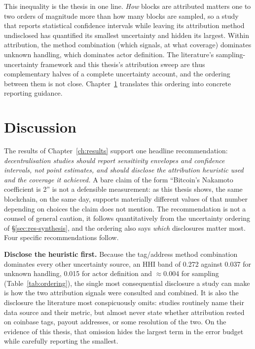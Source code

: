 \documentclass[logo,msc]{infthesis}           %
\begin{document}
This inequality is the thesis in one line. \emph{How} blocks are attributed
matters one to two orders of magnitude more than how many blocks are sampled,
so a study that reports statistical confidence intervals while leaving its
attribution method undisclosed has quantified its smallest uncertainty and
hidden its largest. Within attribution, the method combination (which signals,
at what coverage) dominates unknown handling, which dominates actor definition.
The literature's sampling-uncertainty framework \cite{milad2024statistical} and
this thesis's attribution sweep are thus complementary halves of a complete
uncertainty account, and the ordering between them is not close.
Chapter~\ref{ch:discussion} translates this ordering into concrete reporting
guidance.


\chapter{Discussion}
\label{ch:discussion}

The results of Chapter~\ref{ch:results} support one headline recommendation:
\emph{decentralisation studies should report sensitivity envelopes and
confidence intervals, not point estimates, and should disclose the attribution
heuristic used and the coverage it achieved.} A bare claim of the form
``Bitcoin's Nakamoto coefficient is 2'' is not a defensible measurement: as
this thesis shows, the same blockchain, on the same day, supports materially
different values of that number depending on choices the claim does not
mention. The recommendation is not a counsel of general caution, it follows
quantitatively from the uncertainty ordering of \S\ref{sec:res-synthesis}, and
the ordering also says \emph{which} disclosures matter most. Four specific
recommendations follow.

\textbf{Disclose the heuristic first.} Because the tag/address method
combination dominates every other uncertainty source, an HHI band of 0.272
against 0.037 for unknown handling, 0.015 for actor definition and
$\approx$0.004 for sampling (Table~\ref{tab:ordering}), the single most
consequential disclosure a study can make is how the two attribution signals
were consulted and combined. It is also the disclosure the literature most
conspicuously omits: studies routinely name their data source and their
metric, but almost never state whether attribution rested on coinbase tags,
payout addresses, or some resolution of the two. On the evidence of this
thesis, that omission hides the largest term in the error budget while
carefully reporting the smallest.
\end{document}
